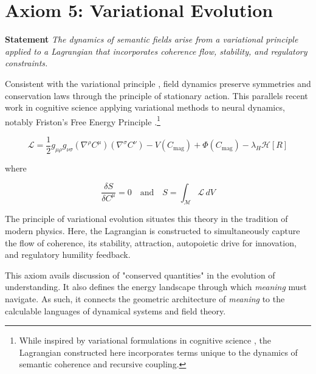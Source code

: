 
\section{Axiom 5: Variational Evolution}
\label{1.5:axiom_5_variational_evolution}

\textbf{Statement} \textit{The dynamics of semantic fields arise from a variational principle applied to a Lagrangian that incorporates coherence flow, stability, and regulatory constraints.}

Consistent with the variational principle \autocite{GoldsteinPooleSafko2002, Arnold1989}, field dynamics preserve symmetries and conservation laws through the principle of stationary action. This parallels recent work in cognitive science applying variational methods to neural dynamics, notably Friston's Free Energy Principle \autocite{Friston2010, Parr2022}.\footnote{While inspired by variational formulations in cognitive science \autocite{Friston2010, Parr2022}, the Lagrangian constructed here incorporates terms unique to the dynamics of semantic coherence and recursive coupling.}

\begin{equation}
\mathcal{L} = \frac{1}{2} g_{\mu\rho} g_{\nu\sigma} (\nabla^\rho C^\mu)(\nabla^\sigma C^\nu) - V(C_{\text{mag}}) + \Phi(C_{\text{mag}}) - \lambda_H \mathcal{H}[R]
\end{equation}

where

\begin{equation}
\frac{\delta S}{\delta C^\mu} = 0 \quad \text{and} \quad S = \int_{\mathcal{M}} \mathcal{L} \, dV
\end{equation}

The principle of variational evolution situates this theory in the tradition of modern physics. Here, the Lagrangian is constructed to simultaneously capture the flow of coherence, its stability, attraction, autopoietic drive for innovation, and regulatory humility feedback.

This axiom avails discussion of "conserved quantities" in the evolution of understanding. It also defines the energy landscape through which \textit{meaning} must navigate. As such, it connects the geometric architecture of \textit{meaning} to the calculable languages of dynamical systems and field theory.



